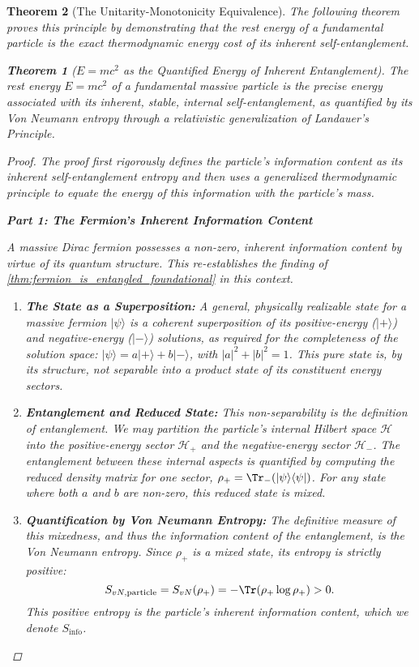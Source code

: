 \documentclass[11pt, letterpaper]{report}
\theoremstyle{plain} %
\newtheorem{theorem}{Theorem}[chapter]
\theoremstyle{definition} %
\theoremstyle{remark} %
\begin{document}
\begin{theorem}[The Unitarity-Monotonicity Equivalence]
The following theorem proves this principle by demonstrating that the rest energy of a fundamental particle is the exact thermodynamic energy cost of its inherent self-entanglement.

\begin{theorem}[$E=mc^2$ as the Quantified Energy of Inherent Entanglement]
\label{thm:emc2_is_entanglement_energy}
The rest energy $E=mc^2$ of a fundamental massive particle is the precise energy associated with its inherent, stable, internal self-entanglement, as quantified by its Von Neumann entropy through a relativistic generalization of Landauer's Principle.
\end{theorem}
\begin{proof}
The proof first rigorously defines the particle's information content as its inherent self-entanglement entropy and then uses a generalized thermodynamic principle to equate the energy of this information with the particle's mass.

\textbf{Part 1: The Fermion's Inherent Information Content}

A massive Dirac fermion possesses a non-zero, inherent information content by virtue of its quantum structure. This re-establishes the finding of \cref{thm:fermion_is_entangled_foundational} in this context.
\begin{enumerate}
    \item \textbf{The State as a Superposition:} A general, physically realizable state for a massive fermion $|\psi\rangle$ is a coherent superposition of its positive-energy ($|+\rangle$) and negative-energy ($|-\rangle$) solutions, as required for the completeness of the solution space: $|\psi\rangle = a|+\rangle + b|-\rangle$, with $|a|^2+|b|^2=1$. This pure state is, by its structure, not separable into a product state of its constituent energy sectors.

    \item \textbf{Entanglement and Reduced State:} This non-separability is the definition of entanglement. We may partition the particle's internal Hilbert space $\mathcal{H}$ into the positive-energy sector $\mathcal{H}_+$ and the negative-energy sector $\mathcal{H}_-$. The entanglement between these internal aspects is quantified by computing the reduced density matrix for one sector, $\rho_+ = \Tr_- (|\psi\rangle\langle\psi|)$. For any state where both $a$ and $b$ are non-zero, this reduced state is mixed.

    \item \textbf{Quantification by Von Neumann Entropy:} The definitive measure of this mixedness, and thus the information content of the entanglement, is the Von Neumann entropy. Since $\rho_+$ is a mixed state, its entropy is strictly positive:
    \begin{equation}
        S_{vN, \text{particle}} = S_{vN}(\rho_+) = -\Tr(\rho_+ \log \rho_+) > 0.
        \label{eq:particle_svn_positive}
    \end{equation}
    This positive entropy is the particle's inherent information content, which we denote $S_{\text{info}}$.
\end{enumerate}


\end{proof}
\end{theorem}
\end{document}
